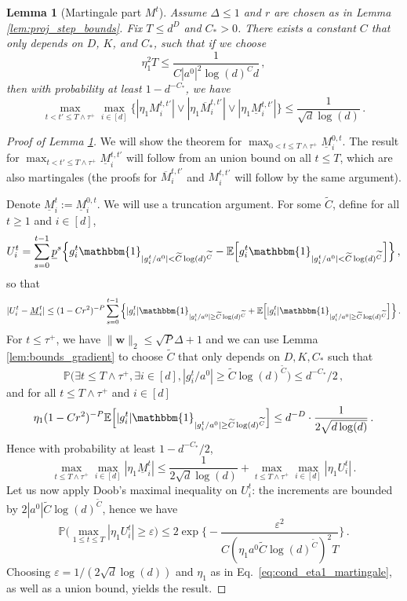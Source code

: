\documentclass[11pt]{article}
\renewcommand{\P}{\mathbb{P}}
\newcommand{\E}{\mathbb{E}}
\newcommand{\eps}{\varepsilon}
\newcommand{\<}{\langle}
\renewcommand{\>}{\rangle}
\newtheorem{lemma}{Lemma}
\theoremstyle{definition}
\def\bw{{\boldsymbol w}}
\def\bw{{\boldsymbol w}}
\def\ind{\mathbbm{1}}
\def\eps{\varepsilon}
\def\uM{\underline{M}}
\def\up{\underline{p}}
\def\oM{\overline{M}}
\def\tC{\widetilde{C}}
\begin{document}
\begin{lemma}[Martingale part $M^t$]\label{lem:bound_M}
Assume $\Delta \leq 1$ and $r$ are chosen as in Lemma \ref{lem:proj_step_bounds}.  Fix $T\leq d^D$ and $C_* >0$. There exists a constant $C$ that only depends on $D$, $K$, and $C_*$, such that if we choose 
\begin{equation}\label{eq:cond_eta1_martingale}
\eta_1^2 T \leq \frac{1}{C|a^0|^2 \log(d)^C d }\, ,
\end{equation}
then with probability at least $1 - d^{-C_*}$, we have 
\begin{equation}\label{eq:bounds_martingale_lem}
\max_{t< t' \leq T \wedge \tau^+} \max_{i \in [d]}  \big\{ |\eta_1 M_i^{t,t'}| \vee |\eta_1 \oM_i^{t,t'}| \vee | \eta_1 \uM_i^{t,t'} | \big\} \leq \frac{1}{\sqrt{d} \log(d)}\, .
\end{equation} 
\end{lemma}

\begin{proof}[Proof of Lemma \ref{lem:bound_M}] We will show the theorem for $\max_{0<t\leq T \wedge \tau^+} \uM_i^{0,t}$. The result for $\max_{t<t'\leq T \wedge \tau^+} \uM_i^{t,t'}$ will follow from an union bound on all $t \leq T$, which are also martingales (the proofs for $\oM_i^{t,t'}$ and $M_i^{t,t'}$ will follow by the same argument). 

Denote $\uM^t_i := \uM^{0,t}_i$. We will use a truncation argument. For some $\tC$, define for all $t \geq 1$ and $i \in [d]$,
\[
U_i^t =  \sum_{s = 0}^{t-1} \up^s \Big\{ g_i^t  \ind_{|g_i^t /a^0| < \tC \log(d)^{\tC}} - \E \Big[ g_i^t  \ind_{|g_i^t /a^0 | < \tC \log(d)^{\tC}} \Big]\Big\} \, ,
\]
so that
\[
| U_i^t - \uM_i^t | \leq (1 - Cr^2)^{-P} \sum_{s=0}^{t-1} \Big\{ |g_i^t | \ind_{|g_i^t /a^0| \geq \tC \log(d)^{\tC}} + \E \Big[ |g_i^t|  \ind_{|g_i^t /a^0| \geq \tC \log(d)^{\tC}} \Big]\Big\} \, .
\]
For $t \leq \tau^+$, we have $\| \bw \|_2 \leq \sqrt{P}\Delta + 1$ and we can use Lemma \ref{lem:bounds_gradient} to choose $\tC$ that only depends on $D,K,C_*$ such that
\[
\P \big( \exists t \leq T \wedge \tau^+, \exists i \in [d], | g_i^t/a^0| \geq \tC \log (d)^{\tC} \big) \leq d^{-C_*}/2\, ,
\]
and  for all $t \leq T\wedge \tau^+$ and $i \in [d]$
\[
\eta_1 (1 - Cr^2)^{-P} \E \Big[ |g_i^t|  \ind_{|g_i^t/a^0 | \geq \tC \log(d)^{\tC}} \Big] \leq d^{-D} \cdot \frac{1}{2\sqrt{d \log (d)}} \, .
\]
Hence with probability at least $1 - d^{-C_*}/2$,
\[
\max_{t \leq T \wedge \tau^+} \max_{i \in [d]}  | \eta_1 \uM_i^t|  \leq \frac{1}{2\sqrt{d} \log(d)} + \max_{t \leq T \wedge \tau^+} \max_{i \in [d]}  | \eta_1 U_i^t|   \, .
\] 
Let us now apply Doob's maximal inequality on $U_i^t$: the increments are bounded by $2 |a^0| \tC \log (d)^{\tC}$, hence we have
\[
\P \Big( \max_{1 \leq t \leq T} | \eta_1 U_i^t | \geq \eps \Big) \leq 2 \exp \Big\{  - \frac{\eps^2}{C (\eta_1 a^0 \tC \log(d)^{\tC})^2 T } \Big\} \, .
\]
Choosing $\eps = 1/(2 \sqrt{d} \log (d))$ and $\eta_1 $ as in Eq.~\eqref{eq:cond_eta1_martingale}, as well as a union bound, yields the result.
\end{proof}
\end{document}

